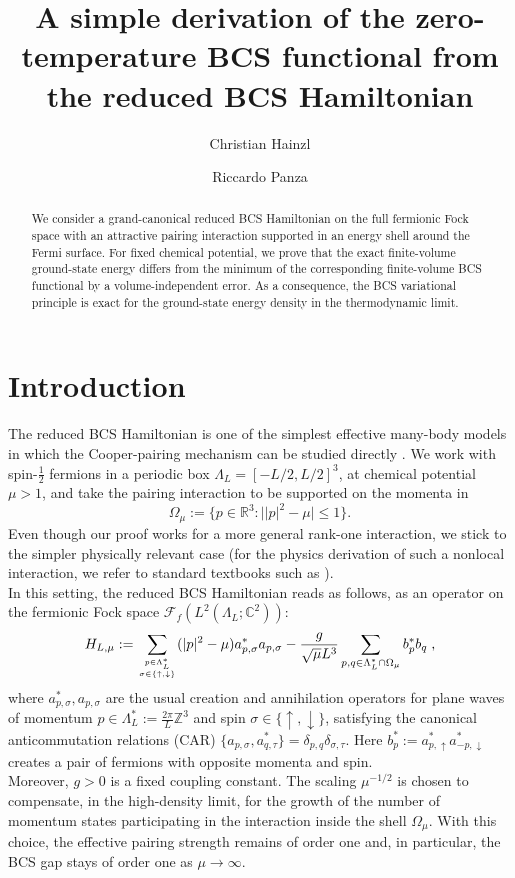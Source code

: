 \documentclass[11pt]{amsart}
\title[Derivation of the BCS functional from the BCS Hamiltonian]
{A simple derivation of the zero-temperature BCS functional from the reduced BCS Hamiltonian}
\author[C. Hainzl]{Christian Hainzl}
\author[R. Panza]{Riccardo Panza}
\date{}
\theoremstyle{definition}
\numberwithin{equation}{section}
\newcommand{\R}{\mathbb R}
\newcommand{\C}{\mathbb C}
\newcommand{\Z}{\mathbb Z}
\newcommand{\1}{\mathbf 1}
\begin{document}
\begin{abstract}
We consider a grand-canonical reduced BCS Hamiltonian on the full fermionic Fock space with an attractive pairing interaction supported in an energy shell around the Fermi surface. For fixed chemical potential, we prove that the exact finite-volume ground-state energy differs from the minimum of the corresponding finite-volume BCS functional by a volume-independent error. As a consequence, the BCS variational principle is exact for the ground-state energy density in the thermodynamic limit.
\end{abstract}

\maketitle

\section{Introduction}\label{sec:introduction}

The reduced BCS Hamiltonian is one of the simplest effective many-body models in which the Cooper-pairing mechanism can be studied directly \cite{BCS1957}. We work with spin-$\frac{1}{2}$ fermions in a periodic box \(\Lambda_L=[-L/2,L/2]^3\), at chemical potential \(\mu>1\),
and take the pairing interaction to be supported on the momenta in
\[
 \Omega_{\mu}
 :=
 \{p\in\R^3:\bigl||p|^2-\mu\bigr|\le1\}.
\]
Even though our proof works for a more general rank-one interaction, we stick to the simpler physically relevant case (for the physics derivation of such a nonlocal interaction, we refer to standard textbooks such as \cite{Fetter}).\\
In this setting, the reduced BCS Hamiltonian reads as follows, as an operator on the fermionic Fock space $\mathcal{F}_f(L^2(\Lambda_L; \C^2))$:
\begin{equation}\label{eq:ReducedHam}
    H_{L, \mu} := \sum_{p \in \Lambda_L^* \atop \sigma \in \{\uparrow, \downarrow\}}(|p|^2 - \mu)a^*_{p, \sigma}a_{p,\sigma} - \frac{g}{\sqrt{\mu}L^3}\sum_{p,q \in \Lambda_L^* \cap \Omega_{\mu}}b^*_p b_q\;,
\end{equation}
where $a^*_{p,\sigma}, a_{p, \sigma}$ are the usual creation and annihilation operators for plane waves of momentum $p \in \Lambda_L^* := \frac{2\pi}{L}\Z^3$ and spin $\sigma \in \{\uparrow, \downarrow\}$, satisfying the canonical anticommutation relations (CAR) $\{a_{p, \sigma}, a^*_{q, \tau}\} = \delta_{p,q}\delta_{\sigma, \tau}$. Here $b^*_p := a^*_{p, \uparrow} a^*_{-p, \downarrow}$ creates a pair of fermions with opposite momenta and spin.
\\
Moreover, \(g>0\) is a fixed coupling constant. The scaling \(\mu^{-1/2}\) is chosen to compensate, in the high-density limit, for the growth of the number of momentum states participating in the interaction inside the shell \(\Omega_\mu\). With this choice, the effective pairing strength remains of order one and, in particular, the BCS gap stays of order one as \(\mu\to\infty\).
\end{document}
